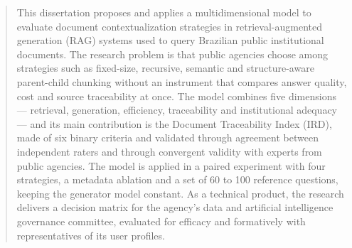
\begin{abstract}
This dissertation proposes and applies a multidimensional model to evaluate
document contextualization strategies in retrieval-augmented generation (RAG)
systems used to query Brazilian public institutional documents. The research
problem is that public agencies choose among strategies such as fixed-size,
recursive, semantic and structure-aware parent-child chunking without an
instrument that compares answer quality, cost and source traceability at once.
The model combines five dimensions --- retrieval, generation, efficiency,
traceability and institutional adequacy --- and its main contribution is the
Document Traceability Index (IRD), made of six binary criteria and validated
through agreement between independent raters and through convergent validity
with experts from public agencies. The model is applied in a paired experiment
with four strategies, a metadata ablation and a set of 60 to 100 reference
questions, keeping the generator model constant. As a technical product, the
research delivers a decision matrix for the agency's data and artificial
intelligence governance committee, evaluated for efficacy and formatively with
representatives of its user profiles.
\end{abstract}
